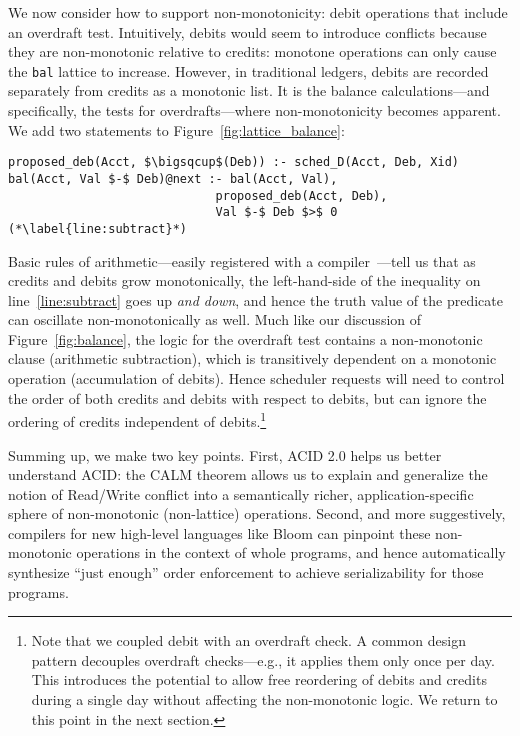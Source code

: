 \documentclass{sig-alternate}
\begin{document}
We now consider how to support non-monotonicity: debit operations that include an overdraft test. 
Intuitively, debits would seem to introduce conflicts because they are 
non-monotonic relative to credits: monotone operations can only cause the
\texttt{bal} lattice to increase. However, in traditional ledgers, debits are recorded separately from credits as a monotonic list.  It is the balance calculations---and specifically, the tests for overdrafts---where non-monotonicity becomes apparent.  We add two statements to Figure~\ref{fig:lattice_balance}:
\begin{scriptsize}
	\begin{lstlisting}[mathescape,firstnumber=7]
proposed_deb(Acct, $\bigsqcup$(Deb)) :- sched_D(Acct, Deb, Xid)
bal(Acct, Val $-$ Deb)@next :- bal(Acct, Val), 
                             proposed_deb(Acct, Deb), 
                             Val $-$ Deb $>$ 0 (*\label{line:subtract}*)
	\end{lstlisting}
\end{scriptsize}
Basic rules of arithmetic---easily registered with a compiler~\cite{Conway2012}---tell us that as credits and debits grow monotonically, the left-hand-side of the inequality on line~\ref{line:subtract} goes up {\em and down}, and hence the truth value of the predicate can oscillate non-monotonically as well.  Much like our discussion of Figure~\ref{fig:balance}, the logic for the overdraft test contains a non-monotonic clause (arithmetic subtraction), which is transitively dependent on a monotonic operation (accumulation of debits).  Hence scheduler requests will need to control the order of both credits and debits with respect to debits, but can ignore the ordering of credits independent of debits.\footnote{Note that we coupled debit with an overdraft check.  A common design pattern decouples overdraft checks---e.g., it applies them only once per day.  This introduces the potential to allow free reordering of debits and credits during a single day without affecting the non-monotonic logic.  We return to this point in the next section.}

Summing up, we make two key points.  First, ACID 2.0 helps us better understand ACID: the CALM theorem allows us to explain and generalize the notion of Read/Write conflict into a semantically richer, application-specific sphere of non-monotonic (non-lattice) operations.  Second, and more suggestively, compilers for new high-level languages like Bloom can pinpoint these non-monotonic operations in the context of whole programs, and hence automatically synthesize ``just enough'' order enforcement to achieve serializability for those programs.
\end{document}

